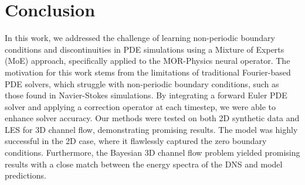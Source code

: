 \section{Conclusion}
In this work, we addressed the challenge of learning non-periodic boundary conditions and discontinuities in PDE simulations using a Mixture of Experts (MoE) approach, specifically applied to the MOR-Physics neural operator. The motivation for this work stems from the limitations of traditional Fourier-based PDE solvers, which struggle with non-periodic boundary conditions, such as those found in Navier-Stokes simulations. By integrating a forward Euler PDE solver and applying a correction operator at each timestep, we were able to enhance solver accuracy. Our methods were tested on both 2D synthetic data and LES for 3D channel flow, demonstrating promising results. The model was highly successful in the 2D case, where it flawlessly captured the zero boundary conditions. Furthermore, the Bayesian 3D channel flow problem yielded promising results with a close match between the energy spectra of the DNS and model predictions.

